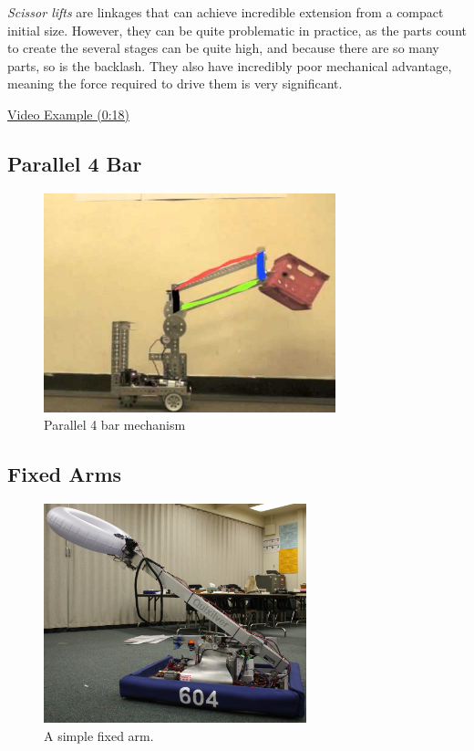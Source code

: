 \textit{Scissor lifts} are linkages that can achieve incredible extension from a compact initial size. However, they can be quite problematic in practice, as the parts count to create the several stages can be quite high, and because there are so many parts, so is the backlash. They also have incredibly poor mechanical advantage, meaning the force required to drive them is very significant.

\href{https://youtu.be/J_VfCjKBGNw?t=18}{\color{red}\underline{Video Example (0:18)}}
\subsection{Parallel 4 Bar}
\begin{figure}[H]
	\includegraphics[height=2.5in]{imgs/parallel_4bar.jpeg}
	\caption{Parallel 4 bar mechanism}
\end{figure}

\subsection{Fixed Arms}

\begin{figure}[H]
	\includegraphics[height=2.5in]{imgs/simple_arm.jpeg}
	\caption{A simple fixed arm.}
\end{figure}

